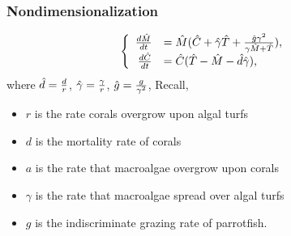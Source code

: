 \begin{frame}\frametitle{Nondimensionalization}$$\begin{cases}
\begin{array}{rl}
\frac{d\HAT{M}}{dt}&= \HAT{M}(\HAT{C}+\HAT{\gamma}\HAT{T}+\frac{\HAT{g}\gamma^2}{\gamma\HAT{M}+ \HAT{T}}), \\ 
\frac{d\HAT{C}}{dt}&=\HAT{C}(\HAT{T}-\HAT{M}-\HAT{d}\HAT{\gamma}),
\end{array} \end{cases}$$ where $\HAT{d}=\frac{d}{r}$, $\HAT{\gamma} =\frac{\gamma}{r}$, $\HAT{g}=\frac{g}{\gamma^2}$,  Recall, \begin{itemize}\itemsep0pt
\item $r$ is the rate corals overgrow upon algal turfs\\
\item $d$ is the mortality rate of corals\\
\item $a$ is the rate that macroalgae overgrow upon corals\\
\item $\gamma$ is the rate that macroalgae spread over algal turfs\\
\item $g$ is the indiscriminate grazing rate of parrotfish.
\end{itemize}
\end{frame}


